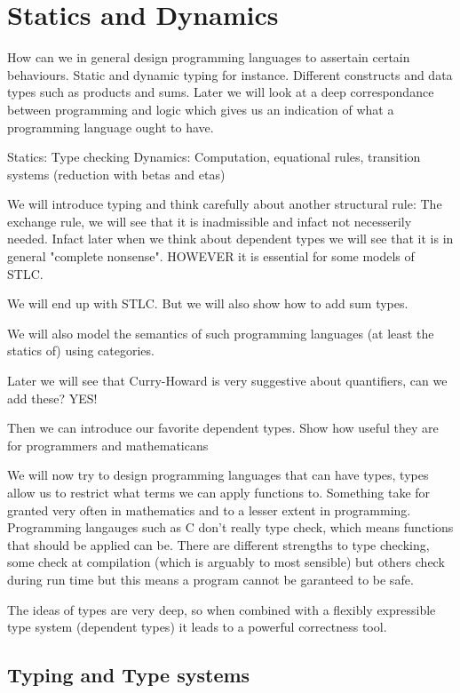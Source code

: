 \section{Statics and Dynamics}

How can we in general design programming languages to assertain certain behaviours. Static and dynamic typing for instance. Different constructs and data types such as products and sums. Later we will look at a deep correspondance between programming and logic which gives us an indication of what a programming language ought to have.

Statics: Type checking
Dynamics: Computation, equational rules, transition systems (reduction with betas and etas)

We will introduce typing and think carefully about another structural rule: The exchange rule, we will see that it is inadmissible and infact not necesserily needed. Infact later when we think about dependent types we will see that it is in general "complete nonsense". HOWEVER it is essential for some models of STLC.

We will end up with STLC. But we will also show how to add sum types.

We will also model the semantics of such programming languages (at least the statics of) using categories.

Later we will see that Curry-Howard is very suggestive about quantifiers, can we add these? YES!

Then we can introduce our favorite dependent types. Show how useful they are for programmers and mathematicans

We will now try to design programming languages that can have types, types allow us to restrict what terms we can apply functions to. Something take for granted very often in mathematics and to a lesser extent in programming. Programming langauges such as C don't really type check, which means functions that should be applied can be. There are different strengths to type checking, some check at compilation (which is arguably to most sensible) but others check during run time but this means a program cannot be garanteed to be safe.

The ideas of types are very deep, so when combined with a flexibly expressible type system (dependent types) it leads to a powerful correctness tool.

\subsection{Typing and Type systems}

